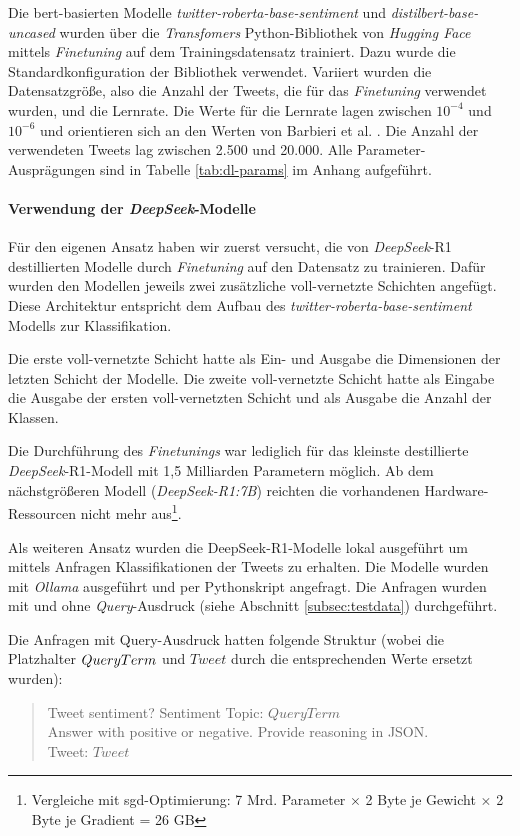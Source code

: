 Die \gls{bert}-basierten Modelle \textit{twitter-roberta\hyp{}base\hyp{}sentiment} und \textit{distilbert-base-uncased} wurden über die \textit{Transfomers} Python-Bibliothek von \textit{Hugging Face} mittels \textit{Finetuning} auf dem Trainingsdatensatz trainiert.
Dazu wurde die Standardkonfiguration der Bibliothek verwendet.
Variiert wurden die Datensatzgröße, also die Anzahl der Tweets, die für das \textit{Finetuning} verwendet wurden, und die Lernrate.
Die Werte für die Lernrate lagen zwischen $10^{-4}$ und $10^{-6}$ und orientieren sich an den Werten von Barbieri et al. \cite{barbieri2020tweeteval}.
Die Anzahl der verwendeten Tweets lag zwischen 2.500 und 20.000.
Alle Parameter-Ausprägungen sind in Tabelle \ref{tab:dl-params} im Anhang aufgeführt.

\paragraph{Verwendung der \textit{DeepSeek}-Modelle}

Für den eigenen Ansatz haben wir zuerst versucht, die von \textit{DeepSeek}-R1 destillierten Modelle durch \textit{Finetuning} auf den Datensatz zu trainieren.
Dafür wurden den Modellen jeweils zwei zusätzliche voll-vernetzte Schichten angefügt.
Diese Architektur entspricht dem Aufbau des \textit{twitter-roberta-base-sentiment} Modells zur Klassifikation.

Die erste voll-vernetzte Schicht hatte als Ein- und Ausgabe die Dimensionen der letzten Schicht der Modelle.
Die zweite voll-vernetzte Schicht hatte als Eingabe die Ausgabe der ersten voll-vernetzten Schicht und als Ausgabe die Anzahl der Klassen.

Die Durchführung des \textit{Finetunings} war lediglich für das kleinste destillierte \textit{DeepSeek}-R1-Modell mit 1,5 Milliarden Parametern möglich.
Ab dem nächstgrößeren Modell (\textit{DeepSeek-R1:7B}) reichten die vorhandenen Hardware-Ressourcen nicht mehr aus\footnote{Vergleiche mit \gls{sgd}-Optimierung: 7 Mrd. Parameter $\times$ 2 Byte je Gewicht $\times$ 2 Byte je Gradient = 26 GB}.

Als weiteren Ansatz wurden die DeepSeek-R1-Modelle lokal ausgeführt um mittels Anfragen Klassifikationen der Tweets zu erhalten.
Die Modelle wurden mit \textit{Ollama} ausgeführt und per Pythonskript angefragt.
Die Anfragen wurden mit und ohne \textit{Query}-Ausdruck (siehe Abschnitt \ref{subsec:testdata}) durchgeführt.

Die Anfragen mit Query-Ausdruck hatten folgende Struktur (wobei die Platzhalter $Query\-Term$ und $Tweet$ durch die entsprechenden Werte ersetzt wurden):
\begin{quote}
    Tweet sentiment? Sentiment Topic: $QueryTerm$\\
    Answer with positive or negative. Provide reasoning in JSON.\\
    Tweet: $Tweet$
\end{quote}

